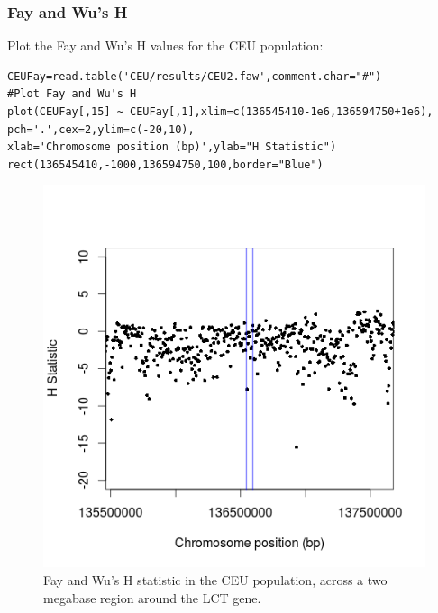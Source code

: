 \documentclass[a4paper,10pt]{article}
\begin{document}
\subsubsection{Fay and Wu's H}
Plot the Fay and Wu's H values for the CEU population:\\
\begin{verbatim}
CEUFay=read.table('CEU/results/CEU2.faw',comment.char="#")
#Plot Fay and Wu's H
plot(CEUFay[,15] ~ CEUFay[,1],xlim=c(136545410-1e6,136594750+1e6),
pch='.',cex=2,ylim=c(-20,10),
xlab='Chromosome position (bp)',ylab="H Statistic")
rect(136545410,-1000,136594750,100,border="Blue") 
\end{verbatim}
\begin{figure}
\centering
\includegraphics{pictures/CEUFay.png}
\caption{Fay and Wu's H statistic in the CEU population, across a two
  megabase region around the LCT gene.}
\label{fig:fayceu}
\end{figure}
\end{document}
